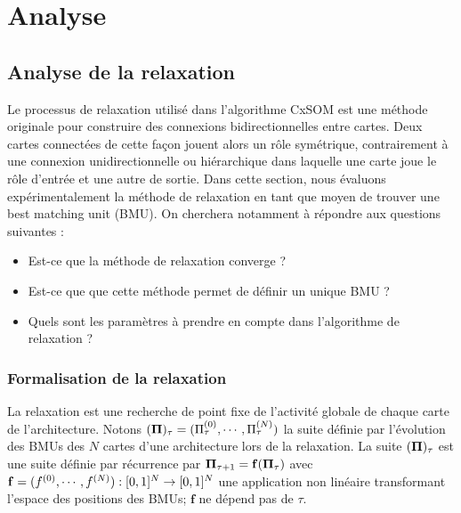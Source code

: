 \chapter{Analyse}
\graphicspath{{04-Analyse/}}
\minitoc
\section{Analyse de la relaxation}Le processus de relaxation utilisé dans l'algorithme CxSOM est une méthode originale pour construire des connexions bidirectionnelles entre cartes. Deux cartes connectées de cette façon jouent alors un rôle symétrique, contrairement à une connexion unidirectionnelle ou hiérarchique dans laquelle une carte joue le rôle d'entrée et une autre de sortie. Dans cette section, nous évaluons expérimentalement la méthode de relaxation en tant que moyen de trouver une best matching unit (BMU). On cherchera notamment à répondre aux questions suivantes :  
\begin{itemize}
\item Est-ce que la méthode de relaxation converge ?
\item Est-ce que que cette méthode permet de définir un unique BMU ?
\item Quels sont les paramètres à prendre en compte dans l'algorithme de relaxation ?
\end{itemize}

\subsection{Formalisation de la relaxation}

La relaxation est une recherche de point fixe de l'activité globale de chaque carte de l'architecture. Notons $(\mathbf{\Pi})_\tau = (\Pi^{({0})}_\tau,\cdots,\Pi^{({N})}_\tau)$ la suite définie par l'évolution des BMUs des $N$ cartes d'une architecture lors de la relaxation.
La suite $(\mathbf{\Pi})_\tau$ est une suite définie par récurrence par $\mathbf{\Pi}_{\tau+1} = \mathbf{f}(\mathbf{\Pi}_\tau)$
avec $\mathbf{f} = (f^{({0})},\cdots,f^{({N})}) : [0,1]^N \rightarrow [0,1]^N$ une application non linéaire transformant l'espace des positions des BMUs; $\mathbf{f}$ ne dépend pas de $\tau$.


